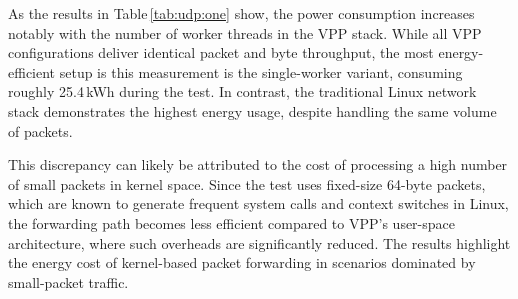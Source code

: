 As the results in Table \ref{tab:udp:one} show, the power consumption increases notably with the number of worker threads in the VPP stack. 
While all VPP configurations deliver identical packet and byte throughput, the most energy-efficient setup is this measurement is the single-worker variant, consuming roughly 25.4 kWh during the test. 
In contrast, the traditional Linux network stack demonstrates the highest energy usage, despite handling the same volume of packets.

This discrepancy can likely be attributed to the cost of processing a high number of small packets in kernel space. 
Since the test uses fixed-size 64-byte packets, which are known to generate frequent system calls and context switches in Linux, 
the forwarding path becomes less efficient compared to VPP’s user-space architecture, where such overheads are significantly reduced. 
The results highlight the energy cost of kernel-based packet forwarding in scenarios dominated by small-packet traffic.

